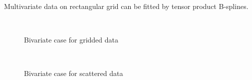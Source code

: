 \documentclass[10pt,twocolumn]{article}          %
\begin{document}
Multivariate data on rectangular grid can be fitted by tensor product B-splines.  
  \begin{figure}[ht]
    \centering
    \\
    \caption{Bivariate case for gridded data}\label{fig:cvxfit2d}
  \end{figure}

  \begin{figure}[ht]
    \centering
    \\
    \caption{Bivariate case for scattered data}\label{fig:cvxfitsd}
  \end{figure}
\end{document}
